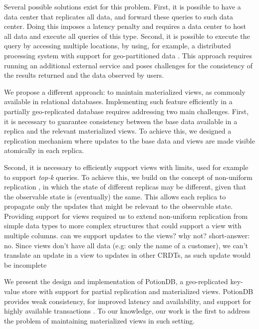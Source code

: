 \documentclass{vldb}
\newcommand{\grumbler}[2]{{\color{red}{\bf #1:} #2}}
\newcommand{\andre}[1]{\grumbler{andre}{#1}}
\newcommand{\nuno}[1]{\grumbler{nuno}{#1}}
\begin{document}
Several possible solutions exist for this problem. 
First, it is possible to have a data center that replicates all data, and forward these queries to such data center.
Doing this imposes a latency penalty and requires a data center to host all data and execute all queries of this type. %
Second, it is possible to execute the query by accessing multiple locations, by using, for example, 
a distributed processing system with support for geo-partitioned data \cite{Kloudas:2015:POD:2850578.2850582,more}.
This approach requires running an additional external service and poses challenges for the consistency of the results
returned and the data observed by users.

We propose a different approach: to maintain materialized views, as commonly available in relational databases.
Implementing such feature efficiently in a partially geo-replicated database requires 
addressing two main challenges. 
First, it is necessary to guarantee consistency between the base data available in a replica and the 
relevant materialized views. To achieve this, we designed a replication mechanism where updates 
to the base data and views are made visible atomically in each replica.

Second, it is necessary to efficiently support views with limits, used for example to support \emph{top-k} 
queries. To achieve this, we build on the concept of non-uniform replication \cite{Cabrita17Nonuniform}, in which the state
of different replicas may be different, given that the observable state is (eventually) the same.
This allows each replica to propagate only the updates that might be relevant to the observable 
state. Providing support for views required us to extend non-uniform replication from simple data 
types to more complex structures that could support a view with multiple columns.
\nuno{can we support updates to the views? why not?}
\andre{short-answer: no. Since views don't have all data (e.g: only the name of a customer), we can't translate an update in a view to updates in other CRDTs, as such update would be incomplete}

We present the design and implementation of PotionDB, a geo-replicated key-value store with support  
for partial replication and materialized views. 
PotionDB provides weak consistency, for improved latency and availability, and support for highly
available transactions \cite{hat}.  
To our knowledge, our work is the first to address the problem of maintaining materialized views
in such setting.  
\end{document}
